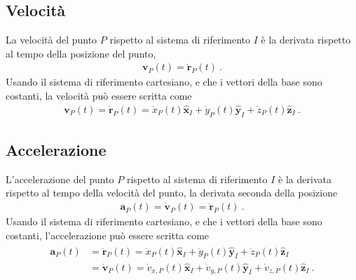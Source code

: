 \documentclass[letterpaper,10pt,english]{jupyterBook}
\begin{document}
\subsection{Velocità}
\label{\detokenize{ch/kinematics-point:velocita}}
\sphinxAtStartPar
La velocità del punto \(P\) rispetto al sistema di riferimento \(I\) è la derivata rispetto al tempo della posizione del punto,
\begin{equation*}
\begin{split}\mathbf{v}_P(t) = \dot{\mathbf{r}}_P(t) \ .\end{split}
\end{equation*}
\sphinxAtStartPar
Usando il sistema di riferimento cartesiano, e che i vettori della base sono costanti, la velocità può essere scritta come
\begin{equation*}
\begin{split}\mathbf{v}_P(t) = \dot{\mathbf{r}}_P(t) = \dot{x}_P(t) \hat{\mathbf{x}}_I + \dot{y}_P(t) \hat{\mathbf{y}}_I + \dot{z}_P(t) \hat{\mathbf{z}}_I \ .\end{split}
\end{equation*}

\subsection{Accelerazione}
\label{\detokenize{ch/kinematics-point:accelerazione}}
\sphinxAtStartPar
L’accelerazione del punto \(P\) rispetto al sistema di riferimento \(I\) è la derivata rispetto al tempo della velocità del punto, la derivata seconda della posizione
\begin{equation*}
\begin{split}\mathbf{a}_P(t) = \dot{\mathbf{v}}_P(t) = \ddot{\mathbf{r}}_P(t) \ .\end{split}
\end{equation*}
\sphinxAtStartPar
Usando il sistema di riferimento cartesiano, e che i vettori della base sono costanti, l’accelerazione può essere scritta come
\begin{equation*}
\begin{split}\begin{aligned}
\mathbf{a}_P(t) & = \ddot{\mathbf{r}}_P(t) = \ddot{x}_P(t) \hat{\mathbf{x}}_I + \ddot{y}_P(t) \hat{\mathbf{y}}_I + \ddot{z}_P(t) \hat{\mathbf{z}}_I \\
                & =  \dot{\mathbf{v}}_P(t) =  \dot{v}_{x,P}(t) \hat{\mathbf{x}}_I + \dot{v}_{y,P}(t) \hat{\mathbf{y}}_I + \dot{v}_{z,P}(t) \hat{\mathbf{z}}_I \ .
\end{aligned}\end{split}
\end{equation*}
\end{document}
